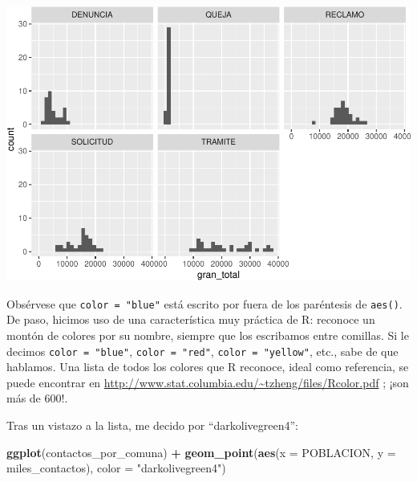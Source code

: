 \documentclass[]{book}
\newenvironment{Shaded}{\begin{snugshade}}{\end{snugshade}}
\newcommand{\KeywordTok}[1]{\textcolor[rgb]{0.13,0.29,0.53}{\textbf{#1}}}
\newcommand{\DataTypeTok}[1]{\textcolor[rgb]{0.13,0.29,0.53}{#1}}
\newcommand{\StringTok}[1]{\textcolor[rgb]{0.31,0.60,0.02}{#1}}
\newcommand{\OperatorTok}[1]{\textcolor[rgb]{0.81,0.36,0.00}{\textbf{#1}}}
\newcommand{\NormalTok}[1]{#1}
\begin{document}
\includegraphics{ciencia_de_datos_politicas_publicas_files/figure-latex/unnamed-chunk-85-1.pdf}

Obsérvese que \texttt{color\ =\ "blue"} está escrito por fuera de los
paréntesis de \texttt{aes()}. De paso, hicimos uso de una característica
muy práctica de R: reconoce un montón de colores por su nombre, siempre
que los escribamos entre comillas. Si le decimos
\texttt{color\ =\ "blue"}, \texttt{color\ =\ "red"},
\texttt{color\ =\ "yellow"}, etc., sabe de que hablamos. Una lista de
todos los colores que R reconoce, ideal como referencia, se puede
encontrar en \url{http://www.stat.columbia.edu/~tzheng/files/Rcolor.pdf}
; ¡son más de 600!.

Tras un vistazo a la lista, me decido por ``darkolivegreen4'':

\begin{Shaded}
\begin{Highlighting}[]
\KeywordTok{ggplot}\NormalTok{(contactos_por_comuna) }\OperatorTok{+}\StringTok{ }
\StringTok{    }\KeywordTok{geom_point}\NormalTok{(}\KeywordTok{aes}\NormalTok{(}\DataTypeTok{x =}\NormalTok{ POBLACION, }\DataTypeTok{y =}\NormalTok{ miles_contactos), }\DataTypeTok{color =} \StringTok{"darkolivegreen4"}\NormalTok{)}
\end{Highlighting}
\end{Shaded}
\end{document}
